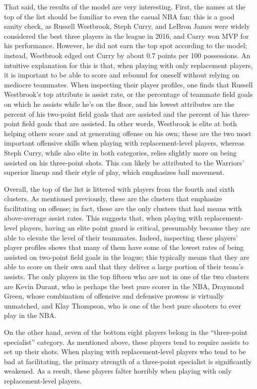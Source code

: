 That said, the results of the model are very interesting. First, the names at the
top of the list should be familiar to even the casual NBA fan; this is a good sanity
check, as Russell Westbrook, Steph Curry, and LeBron James were widely considered
the best three players in the league in 2016, and Curry won MVP for his performance.
However, he did not earn the top spot according to the model; instead, Westbrook
edged out Curry by about 0.7 points per 100 possessions. An intuitive explanation
for this is that, when playing with only replacement players, it is important to be
able to score and rebound for oneself without relying on mediocre teammates.  When
inspecting their player profiles, one finds that Russell Westbrook's top attribute
is assist rate, or the percentage of teammate field goals on which he assists while
he's on the floor, and his lowest attributes are the percent of his two-point field
goals that are assisted and the percent of his three-point field goals that are
assisted. In other words, Westbrook is elite at both helping others score and at
generating offense on his own; these are the two most important offensive skills
when playing with replacement-level players, whereas Steph Curry, while also elite
in both categories, relies slightly more on being assisted on his three-point shots.
This can likely be attributed to the Warriors' superior lineup and their style of
play, which emphasizes ball movement.

Overall, the top of the list is littered with players from the fourth and sixth
clusters. As mentioned previously, these are the clusters that emphasize
facilitating on offense; in fact, these are the only clusters that had means with
above-average assist rates. This suggests that, when playing with replacement-level
players, having an elite point guard is critical, presumably because they are able
to elevate the level of their teammates. Indeed, inspecting these players' player
profiles shows that many of them have some of the lowest rates of being assisted on
two-point field goals in the league; this typically means that they are able to
score on their own and that they deliver a large portion of their team's assists.
The only players in the top fifteen who are not in one of the two clusters are Kevin
Durant, who is perhaps the best pure scorer in the NBA, Draymond Green, whose
combination of offensive and defensive prowess is virtually unmatched, and Klay
Thompson, who is one of the best pure shooters to ever play in the NBA.

On the other hand, seven of the bottom eight players belong in the ``three-point
specialist'' category. As mentioned above, these players tend to require assists to
set up their shots. When playing with replacement-level players who tend to be bad
at facilitating, the primary strength of a three-point specialist is significantly
weakened. As a result, these players falter horribly when playing with only
replacement-level players.

